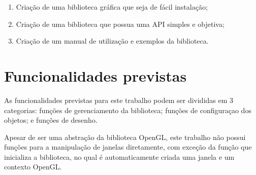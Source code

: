 \documentclass[12pt, %
openright,
oneside, %
a4paper,    %
brazil]{facom-ufu-abntex2}
\begin{document}
\begin{enumerate}
\item Criação de uma biblioteca gráfica que seja de fácil instalação;
\item Criação de uma biblioteca que possua uma API simples e objetiva;
\item Criação de um manual de utilização e exemplos da biblioteca.
\end{enumerate}

\section{Funcionalidades previstas}
As funcionalidades previstas para este trabalho podem ser divididas em 3 categorias: funções de gerenciamento da biblioteca; funções de configuraçao dos objetos; e funções de desenho.

Apesar de ser uma abstração da biblioteca OpenGL, este trabalho não possui funções para a manipulação de janelas diretamente, com exceção da função que inicializa a biblioteca, no qual é automaticamente criada uma janela e um contexto OpenGL.
\end{document}
